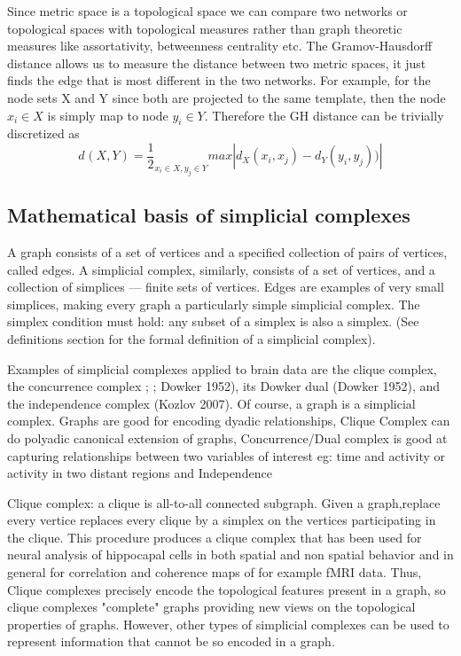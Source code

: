 \documentclass[onecollarge,runningheads]{svjour2}
\begin{document}
Since metric space is a topological space we can compare two networks or topological spaces with topological measures rather than graph theoretic measures like assortativity, betweenness centrality etc.
The Gramov-Hausdorff distance allows us to measure the distance between two metric spaces, it just finds the edge that is most different in the two networks. For example, for the node sets X and Y since both are projected to the same template, then the node $x_i \in X$ is simply map to node $y_i \in Y$. Therefore the GH distance can be trivially discretized as 
\begin{equation}
d_{}(X,Y) = \frac{1}{2}_{x_i \in X, y_j \in Y} max |d_X(x_i,x_j) - d_Y(y_i,y_j))|
\end{equation} 

\subsection{Mathematical basis of simplicial complexes }
A graph consists of a set of vertices and a specified collection of pairs of vertices, called edges. A simplicial complex, similarly, consists of a set of vertices, and a collection of simplices — finite sets of vertices. Edges are examples of very small simplices, making every graph a particularly simple simplicial complex.
The simplex condition must hold: any subset of a simplex is also a simplex. (See definitions section for the formal definition of a simplicial complex). 

Examples of simplicial complexes applied to brain data are the clique complex, the concurrence complex \citep{ellis2012describing}; \citep{curto2008cell}; Dowker 1952), its Dowker dual (Dowker 1952), and the independence complex (Kozlov 2007).
Of course, a graph is a simplicial complex. Graphs are good for encoding dyadic relationships, Clique Complex can do polyadic canonical extension of graphs, Concurrence/Dual complex is good at capturing relationships between two variables of interest eg: time and activity or activity in two distant regions and  Independence 

Clique complex:  a clique is all-to-all connected subgraph. Given a graph,replace every vertice replaces every clique by a simplex on the vertices participating in the clique. This procedure produces a clique complex that has been used for neural analysis of hippocapal cells in both spatial and non spatial behavior \citep{giusti2015clique} and in general for correlation and coherence maps of for example fMRI data.
Thus, Clique complexes precisely encode the topological features present in a graph, so clique complexes "complete" graphs providing new views on the topological properties of graphs.
However, other types of simplicial complexes can be used to represent information that cannot be so encoded in a graph.
\end{document}
